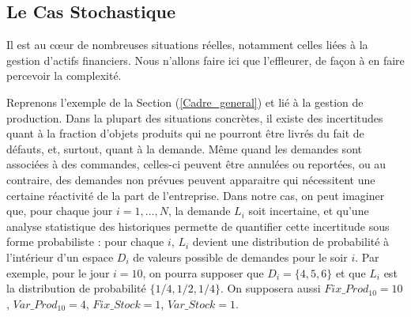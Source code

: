 \subsection{Le Cas Stochastique}
\label{Le_Cas_Stochastique}

Il est au cœur de nombreuses situations réelles, notamment celles liées à la gestion d'actifs financiers. Nous n'allons faire ici que l'effleurer, de façon à en faire percevoir la complexité.

Reprenons l'exemple de la Section (\ref{Cadre_general}) et lié à la gestion de production. Dans la plupart des situations concrètes, il existe des incertitudes quant à la fraction d'objets produits qui ne pourront être livrés du fait de défauts, et, surtout, quant à la demande. Même quand les demandes sont associées à des commandes, celles-ci peuvent être annulées ou reportées, ou au contraire, des demandes non prévues peuvent apparaitre qui nécessitent une certaine réactivité de la part de l'entreprise. Dans notre cas, on peut imaginer que, pour chaque jour $i = 1, \dots, N$, la demande $L_i$ soit incertaine, et qu'une analyse statistique des historiques permette de quantifier cette incertitude sous forme probabiliste : pour chaque $i$, $L_i$ devient une distribution de probabilité à l'intérieur d'un espace $D_i$ de valeurs possible de demandes pour le soir $i$. Par exemple, pour le jour $i = 10$, on pourra supposer que $D_i = \{4, 5, 6\}$ et que $L_i$ est la distribution de probabilité $\{1/4, 1/2, 1/4\}$. On supposera aussi $Fix\_Prod_{10} = 10$, $Var\_Prod_{10} = 4$,  $Fix\_Stock = 1$, $Var\_Stock = 1$.

